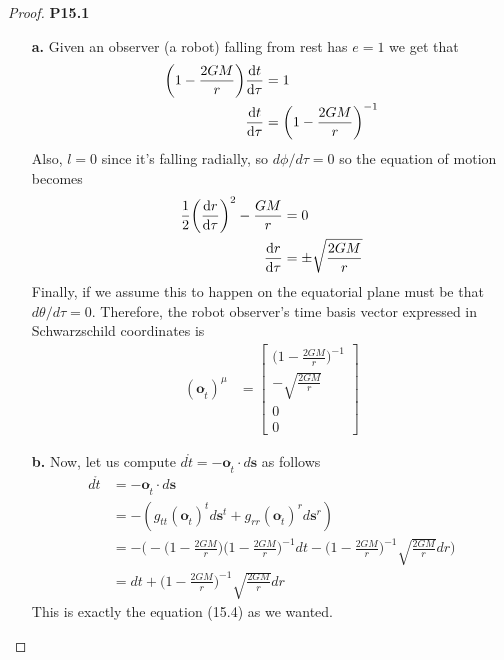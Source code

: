 \documentclass[11pt]{article}
\theoremstyle{definition}
\begin{document}
\cleardoublepage
\begin{proof}{\textbf{P15.1}}
\begin{itemize}
\item [\textbf{a.}] Given an observer (a robot) falling from rest has $e = 1$
we get that
\begin{align*}
    \bigg(1 - \frac{2GM}{r}\bigg)\dv{t}{\tau} &= 1\\
    \dv{t}{\tau} &= \bigg(1 - \frac{2GM}{r}\bigg)^{-1}
\end{align*}
Also, $l = 0$ since it's falling radially, so $d\phi/d\tau = 0$ so the
equation of motion becomes
\begin{align*}
    \frac{1}{2}\bigg(\dv{r}{\tau}\bigg)^{2} - \frac{GM}{r} &= 0\\
    \dv{r}{\tau} &= \pm\sqrt{\frac{2GM}{r}}
\end{align*}
Finally, if we assume this to happen on the equatorial plane must be that
$d\theta/d\tau = 0$. Therefore, the robot observer's time basis vector
expressed in Schwarzschild coordinates is
\begin{align*}
    (\bm{o}_{\mathring{t}})^\mu &= \begin{bmatrix}
        \big(1 - \frac{2GM}{r}\big)^{-1}\\[7pt]
        -\sqrt{\frac{2GM}{r}}\\[7pt]
        0\\[7pt] 0
    \end{bmatrix}
\end{align*}
\item [\textbf{b.}] Now, let us compute
$d\mathring{t} = -\bm{o}_{\mathring{t}}\cdot d\bm{s}$ as follows
\begin{align*}
    d\mathring{t} &= -\bm{o}_{\mathring{t}}\cdot d\bm{s}\\
    &= -(g_{tt}(\bm{o}_{\mathring{t}})^t d\bm{s}^t + g_{rr}(\bm{o}_{\mathring{t}})^r d\bm{s}^r)\\
    &= -\bigg(
    -\bigg(1 - \frac{2GM}{r}\bigg)\bigg(1 - \frac{2GM}{r}\bigg)^{-1}dt
    - \bigg(1 - \frac{2GM}{r}\bigg)^{-1}\sqrt{\frac{2GM}{r}}dr
    \bigg)\\
    &= dt + \bigg(1 - \frac{2GM}{r}\bigg)^{-1}\sqrt{\frac{2GM}{r}}dr
\end{align*}
This is exactly the equation (15.4) as we wanted.
\end{itemize}
\end{proof}
\end{document}
